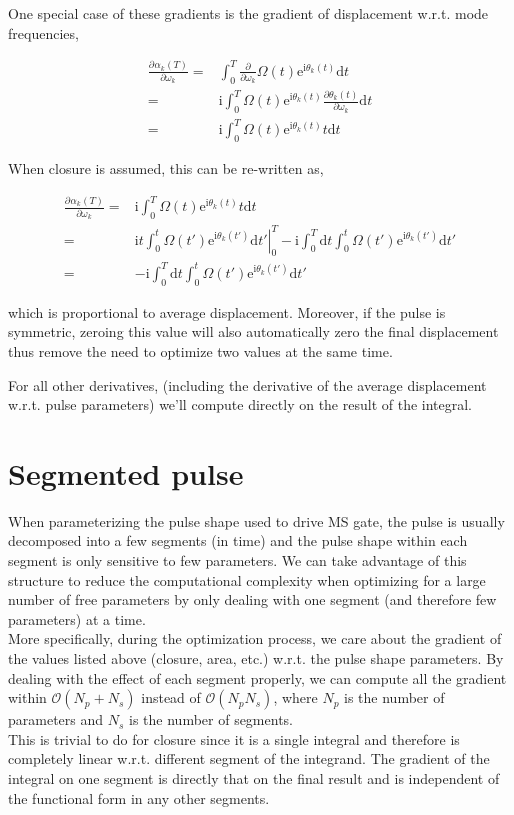 \documentclass[10pt,fleqn]{article}
\newcommand{\ud}{\mathrm{d}}
\newcommand{\ue}{\mathrm{e}}
\newcommand{\ui}{\mathrm{i}}
\newcommand{\eqar}[1]
{
  \begin{align*}
    #1
  \end{align*}
}
\newcommand{\pdiff}[3][{}]{{\frac{\partial^{#1} {#2}}{\partial {#3}{}^{#1}}}}
\begin{document}
One special case of these gradients is the gradient of displacement
w.r.t. mode frequencies,
\eqar{
  \pdiff{\alpha_k(T)}{\omega_k}=&\int_0^T\frac{\partial}{\partial\omega_k}\Omega(t)\ue^{\ui\theta_k(t)}\ud t\\
  =&\ui\int_0^T\Omega(t)\ue^{\ui\theta_k(t)}\frac{\partial\theta_k(t)}{\partial\omega_k}\ud t\\
  =&\ui\int_0^T\Omega(t)\ue^{\ui\theta_k(t)}t\ud t
}
When closure is assumed, this can be re-written as,
\eqar{
  \pdiff{\alpha_k(T)}{\omega_k}=&\ui\int_0^T\Omega(t)\ue^{\ui\theta_k(t)}t\ud t\\
  =&\ui\left.t\int_0^t\Omega(t')\ue^{\ui\theta_k(t')}\ud t'\right|_0^T-\ui\int_0^T\ud t\int_0^t\Omega(t')\ue^{\ui\theta_k(t')}\ud t'\\
  =&-\ui\int_0^T\ud t\int_0^t\Omega(t')\ue^{\ui\theta_k(t')}\ud t'
}
which is proportional to average displacement.
Moreover, if the pulse is symmetric, zeroing this value will also automatically
zero the final displacement thus remove the need to optimize
two values at the same time.

For all other derivatives, (including the derivative of the average displacement
w.r.t. pulse parameters) we'll compute directly on the result of the integral.

\section{Segmented pulse}
When parameterizing the pulse shape used to drive MS gate,
the pulse is usually decomposed into a few segments (in time)
and the pulse shape within each segment is only sensitive to
few parameters. We can take advantage of this structure
to reduce the computational complexity when optimizing for
a large number of free parameters by only dealing with one segment
(and therefore few parameters) at a time.\\

More specifically, during the optimization process,
we care about the gradient of the values listed above (closure, area, etc.)
w.r.t. the pulse shape parameters.
By dealing with the effect of each segment properly,
we can compute all the gradient within $\mathcal{O}(N_p + N_s)$
instead of $\mathcal{O}(N_pN_s)$, where $N_p$ is the number of parameters
and $N_s$ is the number of segments.\\

This is trivial to do for closure since it is a single integral
and therefore is completely linear w.r.t. different segment of the integrand.
The gradient of the integral on one segment is directly that on the final result
and is independent of the functional form in any other segments.\\
\end{document}
